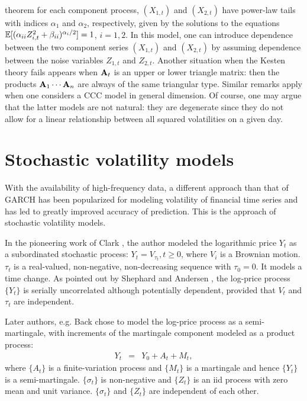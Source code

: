 theorem for each component process, $(X_{1,t})$ and $(X_{2,t})$ have
power-law tails  with indices $\alpha_1$ and $\alpha_2$, respectively,
given by the solutions to the equations  $\mathbb{E} [(\alpha_{ii}
Z_{i,t}^2+\beta_{ii})^{\alpha_i/2}]=1$, $i=1,2$. In this model, one
can introduce dependence between the two component series $(X_{1,t})$
and $(X_{2,t})$ by assuming dependence between the noise variables
$Z_{1,t}$ and $Z_{2,t}$. Another situation when the Kesten theory fails 
appears when ${\mathbf A}_t$ is an upper or lower triangle matrix: then the
products  ${\mathbf A}_1\cdots{\mathbf A}_n$ are always of the same triangular
type. 
Similar remarks apply when one considers a CCC model in general
dimension. Of course, one may argue that the latter models 
are not natural: they are degenerate since they do not allow 
for a linear relationship between all squared volatilities on a given
day.

\section{Stochastic volatility models}
\label{sec:SV:intro}
With the availability of high-frequency data, a different approach
than that of GARCH has been popularized for modeling volatility of
financial time series and has led to greatly improved accuracy of
prediction. This is the approach of stochastic volatility models.

In the pioneering work of Clark \cite{clark:1973}, the author modeled
the logarithmic price $Y_t$ as a subordinated stochastic process:
$Y_t = V_{\tau_t}, t\geq 0$, where $V_i$ is a Brownian motion.
$\tau_t$ is a real-valued, non-negative, non-decreasing
sequence with $\tau_0 = 0$. It models a time change. As pointed out by
Shephard and Andersen \cite{Shephard:Andersen:2009}, the log-price
process $\{Y_t\}$ is serially uncorrelated although potentially dependent,
provided that $V_t$ and $\tau_t$ are independent.

Later authors, e.g. Back \cite{back:1991} chose to model the log-price
process as a semi-martingale, with increments of the martingale
component modeled as a product process:
\begin{eqnarray*}
  Y_t &=& Y_0 + A_t + M_t,
\end{eqnarray*}
where $\{A_t\}$ is a finite-variation process and $\{M_t\}$ is a
martingale and hence $\{Y_t\}$ is a semi-martingale.
$\{\sigma_t\}$ is non-negative and $\{Z_t\}$ is an iid process with
zero mean and unit variance. $\{\sigma_t\}$ and $\{Z_t\}$ are
independent of each other.

